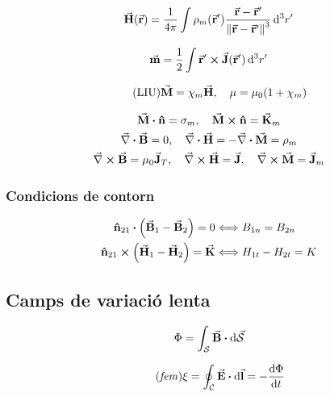 \begin{align*}
	\va{H}(\va{r}) = \frac{1}{4\pi} \int \rho_{m}(\va{r}') \frac{\va{r} - \va{r}'}{\norm{\va{r} - \va{r}'}^{3}} \dd[3]{r'}
\end{align*}

\begin{align*}
	\va{m} = \frac{1}{2} \int \va{r}' \cross \va{J}(\va{r}') \dd[3]{r'}
\end{align*}

\begin{align}\tag{LIU}
	\va{M} = \chi_{m} \va{H} \qc \mu = \mu_{0}\qty(1 + \chi_{m})
\end{align}

\begin{align*}
\begin{gathered}
	\va{M} \vdot \vu{n} = \sigma_{m} \qc \va{M} \cross \vu{n} = \va{K}_{m} \\
	 \div{B} = 0 \qc \div{H} = -\div{M} = \rho_{m} \\
	\rot{B} = \mu_{0} \va{J}_{T} \qc \rot{H} = \va{J} \qc \rot{M} = \va{J}_{m}
\end{gathered}
\end{align*}

\subsubsection*{Condicions de contorn}
\begin{align*}
\begin{aligned}
	\vu{n}_{21} \vdot \qty(\va{B}_{1} - \va{B}_{2}) = 0 &\Longleftrightarrow B_{1n} = B_{2n} \\
	\vu{n}_{21} \cross \qty(\va{H}_{1} - \va{H}_{2}) = \va{K} &\Longleftrightarrow H_{1t} - H_{2t} = K
\end{aligned}
\end{align*}

\subsection{Camps de variació lenta}
\begin{align*}
	\Phi = \int_{\mc{S}} \va{B} \vdot \dd{\va{\mc{S}}}
\end{align*}

\begin{align*}\tag{\emph{fem}}
	\xi = \oint_{\mc{C}} \va{E} \vdot \dd{\va{l}} = - \dv{\Phi}{t}
\end{align*}

